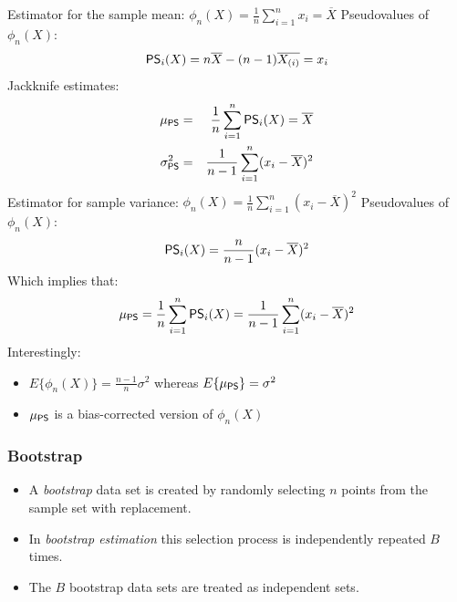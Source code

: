   \begin{example}
    \small
    Estimator for the sample mean: $\phi_n(X) = \frac{1}{n} \sum_{i=1}^n x_i = \overline{X}$     Pseudovalues of $\phi_n(X)$:
    \begin{displaymath}
      {\mathop{\mathsf{PS}}}_i(X) = n\overline{X} - (n-1) \overline{X_{(i)}} = x_i
    \end{displaymath}
    Jackknife estimates:
    \begin{eqnarray*}
      \mu_{{\mathop{\mathsf{PS}}}}      &=& \frac{1}{n} \sum_{i=1}^n {\mathop{\mathsf{PS}}}_i(X) = \overline{X} \\
      \sigma_{{\mathop{\mathsf{PS}}}}^2 &=& \frac{1}{n-1} \sum_{i=1}^n (x_i - \overline{X})^2
    \end{eqnarray*}
    Estimator for sample variance: $\phi_n(X) = \frac{1}{n} \sum_{i=1}^n (x_i - \overline{X})^2$  
    Pseudovalues of $\phi_n(X)$:
    \begin{displaymath}
      {\mathop{\mathsf{PS}}}_i(X) = \frac{n}{n-1} (x_i - \overline{X})^2
    \end{displaymath}
    Which implies that:
    \begin{displaymath}
      \mu_{{\mathop{\mathsf{PS}}}} = \frac{1}{n} \sum_{i=1}^n {\mathop{\mathsf{PS}}}_i(X) = \frac{1}{n-1} \sum_{i=1}^n (x_i - \overline{X})^2
    \end{displaymath}
Interestingly:\\
    \begin{itemize}
      \item[ $\bullet$] $E\{\phi_n(X)\} = \frac{n-1}{n}\sigma^2$ whereas $E\{ \mu_{{\mathop{\mathsf{PS}}}} \} = \sigma^2$
      \item[ $\bullet$] $\mu_{{\mathop{\mathsf{PS}}}}$ is a bias-corrected version of $\phi_n(X)$
    \end{itemize}
  \end{example}
         
\subsubsection{Bootstrap}
  \begin{itemize}
    \item A \textit{bootstrap} data set is created by randomly selecting $n$ points from the sample set with replacement.            
    \item In \textit{bootstrap estimation} this selection process is independently repeated $B$ times.            
    \item The $B$ bootstrap data sets are treated as independent sets.
  \end{itemize}

